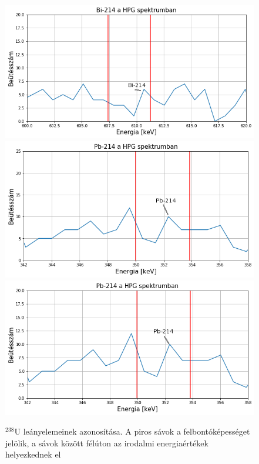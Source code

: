 \documentclass[12pt,a4paper]{article}
\begin{document}
\begin{figure}[!h]
\centering
\includegraphics[scale=1]{Bi_csucs}
\includegraphics[scale=1]{Pb_csucs}
\includegraphics[scale=1]{Pb_2csucs}
\caption{$^{238}$U leányelemeinek azonosítása. A piros sávok a felbontóképességet jelölik, a sávok között félúton az irodalmi energiaértékek helyezkednek el}
\end{figure}
\newpage
\end{document}
